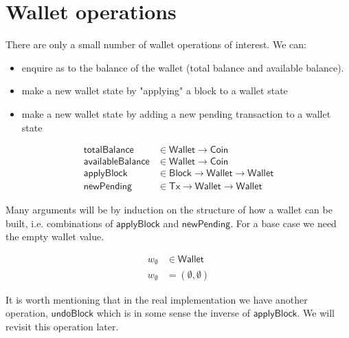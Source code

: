 \documentclass{article}
\begin{document}
\section{Wallet operations}
\label{sec:wallet_operations}

There are only a small number of wallet operations of interest. We can:
\begin{itemize}
\item enquire as to the balance of the wallet (total balance and
      available balance).
\item make a new wallet state by "applying" a block to a wallet state
\item make a new wallet state by adding a new pending transaction to a wallet
      state
\end{itemize}

\begin{equation}
\begin{split}
\mathsf{totalBalance}     & \in \mathsf{Wallet} \to \mathsf{Coin} \\
\mathsf{availableBalance} & \in \mathsf{Wallet} \to \mathsf{Coin} \\
\mathsf{applyBlock}       & \in \mathsf{Block} \to \mathsf{Wallet}
                                             \to \mathsf{Wallet} \\
\mathsf{newPending}       & \in \mathsf{Tx} \to \mathsf{Wallet}
                                          \to \mathsf{Wallet}
\end{split}
\end{equation}

Many arguments will be by induction on the structure of how a wallet can be
built, i.e. combinations of $\mathsf{applyBlock}$ and $\mathsf{newPending}$.
For a base case we need the empty wallet value.

\begin{equation}
\begin{split}
w_\emptyset & \in \mathsf{Wallet} \\
w_\emptyset & = (\emptyset, \emptyset)
\end{split}
\end{equation}

It is worth mentioning that in the real implementation we have another
operation, $\mathsf{undoBlock}$ which is in some sense the inverse of
$\mathsf{applyBlock}$. We will revisit this operation later.

\end{document}
